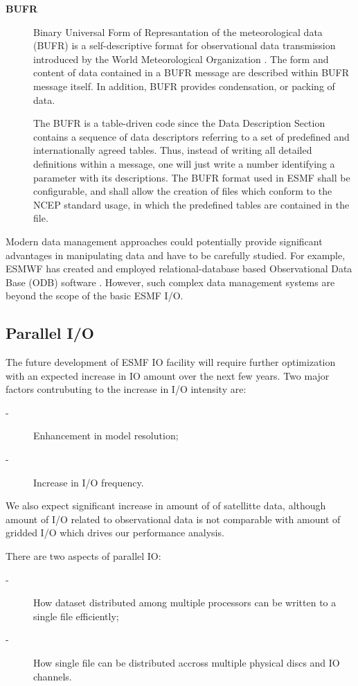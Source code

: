 \begin{description}
\item[\bf BUFR] Binary Universal Form of Represantation of the meteorological 
data (BUFR) is a self-descriptive format for observational data 
transmission introduced by the World Meteorological Organization 
\cite{WMO-BUFR-CREX}. The form and content of data contained in a BUFR 
message are described within BUFR message itself. In addition, BUFR provides 
condensation, or packing of data. 

The BUFR is a table-driven code since the Data Description Section
contains a sequence of data descriptors referring to a set of
predefined and internationally agreed tables. Thus, instead of writing
all detailed definitions within a message, one will just write a
number identifying a parameter with its descriptions. The BUFR format
used in ESMF shall be configurable, and shall allow the creation of
files which conform to the NCEP standard usage, in which the
predefined tables are contained in the file.

\end{description}

Modern data management approaches could potentially provide significant 
advantages in manipulating data and have to be carefully studied.
For example, ESMWF has created and employed relational-database based 
Observational Data Base (ODB) software \cite{ODB}.  However, such complex 
data management systems are beyond the scope of the basic ESMF I/O. 


\subsection{Parallel I/O}

The future development of ESMF IO facility will require further
optimization with an expected increase in IO amount over the next few
years. Two major factors contrubuting to the increase in I/O intensity are:
\begin{description}
\item[-] Enhancement in model resolution;
\item[-] Increase in I/O frequency.
\end{description}
We also expect significant increase in amount of of satellitte data, although 
amount of I/O related to observational data is not comparable with amount of 
gridded I/O which drives our performance analysis. 

There are two aspects of  parallel IO:

\begin{description}
\item[-] How dataset distributed among multiple processors can be
written to a single file efficiently;

\item[-] How single file can be distributed accross multiple physical
discs and IO channels.
\end{description}
 
